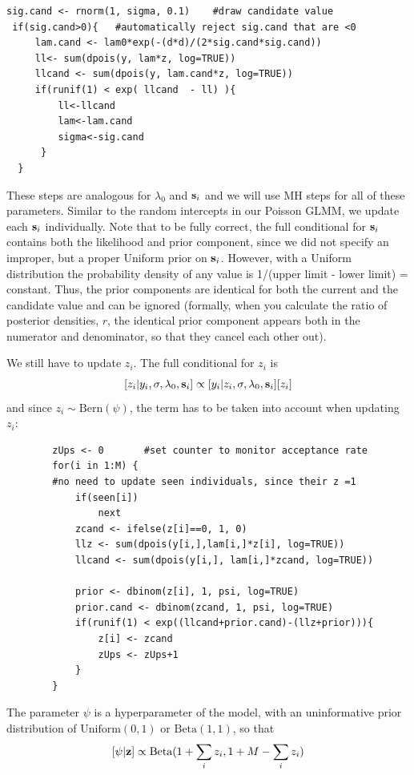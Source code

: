 \begin{verbatim}
sig.cand <- rnorm(1, sigma, 0.1)	#draw candidate value
 if(sig.cand>0){   #automatically reject sig.cand that are <0
     lam.cand <- lam0*exp(-(d*d)/(2*sig.cand*sig.cand))
     ll<- sum(dpois(y, lam*z, log=TRUE))
     llcand <- sum(dpois(y, lam.cand*z, log=TRUE))
     if(runif(1) < exp( llcand  - ll) ){
         ll<-llcand
         lam<-lam.cand
         sigma<-sig.cand
      }
  }
\end{verbatim}

These steps are analogous for  $\lambda_{0}$ and ${\bf s}_i$ and we will
use MH steps for
all of these parameters. Similar to the random intercepts in our
Poisson GLMM, we update each ${\bf s}_i$ individually. Note that to be fully
correct, the full conditional for ${\bf s}_i$ contains both the likelihood and
prior component, since we did not specify an improper, but a proper Uniform
prior on ${\bf s}_i$. However, with a Uniform distribution the probability
density of any value is 1/(upper limit - lower limit) =
constant. Thus, the prior components are identical for both the
current and the candidate value and can be ignored (formally, when you
calculate the ratio of posterior densities, $r$, the identical prior
component appears both in the numerator and denominator, so that they
cancel each other out).

We still have to update $z_i$. The full conditional for $z_i$ is
\[
[z_i|y_{i}, \sigma, \lambda_0, {\bf s}_{i}] \propto [y_{i}|z_{i},\sigma, \lambda_0,
{\bf s}_{i}] [z_i]
\]
and since $z_i \sim \mbox{Bern}(\psi)$,
the term has to be taken into account when updating $z_i$:

\begin{verbatim}
        zUps <- 0		#set counter to monitor acceptance rate
        for(i in 1:M) {
        #no need to update seen individuals, since their z =1
            if(seen[i])
                next
            zcand <- ifelse(z[i]==0, 1, 0)
            llz <- sum(dpois(y[i,],lam[i,]*z[i], log=TRUE))
            llcand <- sum(dpois(y[i,], lam[i,]*zcand, log=TRUE))

            prior <- dbinom(z[i], 1, psi, log=TRUE)
            prior.cand <- dbinom(zcand, 1, psi, log=TRUE)
            if(runif(1) < exp((llcand+prior.cand)-(llz+prior))){
                z[i] <- zcand
                zUps <- zUps+1
            }
        }
\end{verbatim}
The parameter $\psi$ is a hyperparameter of the model, with an uninformative prior
 distribution of $\mbox{Uniform}(0,1)$ or $\mbox{Beta}(1,1)$, so that
\[
[\psi|{\bf z}] \propto \mbox{Beta}(1 + \sum_i z_i, 1 + M-\sum_i z_i)
\]


